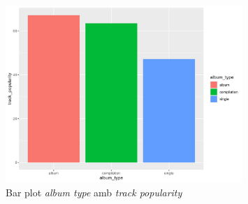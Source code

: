 \begin{figure}[H]
    \centering
    \includegraphics[width=0.8\textwidth]{Images/2_Bivariate/typepopularity.png}
    \caption{Bar plot \textit{album type} amb \textit{track popularity}}
    \label{fig:BivariateR_typepop}
\end{figure}

